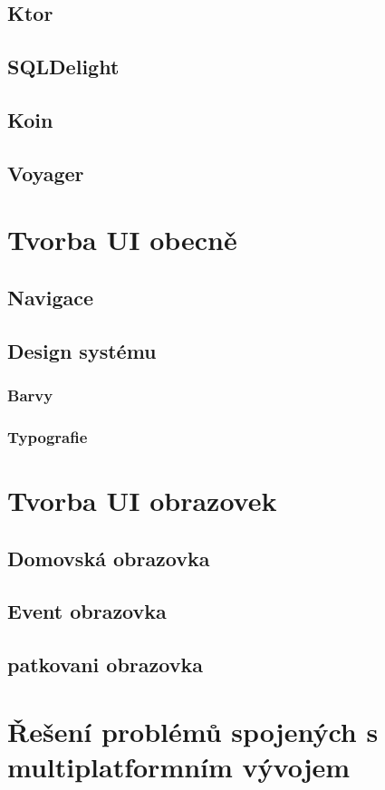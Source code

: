\subsection{Ktor}
\subsection{SQLDelight}
\subsection{Koin}
\subsection{Voyager}

\section{Tvorba UI obecně}
\subsection{Navigace}
\subsection{Design systému}
\subsubsection{Barvy}
\subsubsection{Typografie}

\section{Tvorba UI obrazovek}
\subsection{Domovská obrazovka}
\subsection{Event obrazovka}
\subsection{patkovani obrazovka}



\section{Řešení problémů spojených s multiplatformním vývojem}
